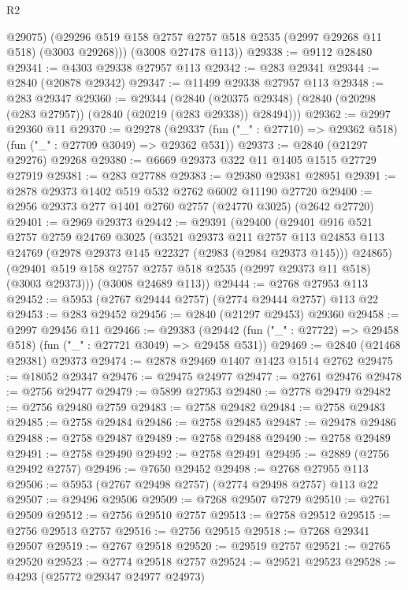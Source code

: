 \begin{lexlean}{R2}
\begin{coremodule}
          @29075)
        (@29296 @519 @158 @2757 @2757 @518 @2535 (@2997 @29268 @11 @518) (@3003 @29268)))
      (@3008 @27478 @113))
@29338 := @9112 @28480
@29341 := @4303 @29338 @27957 @113
@29342 := @283 @29341
@29344 := @2840 (@20878 @29342)
@29347 := @11499 @29338 @27957 @113
@29348 := @283 @29347
@29360 := @29344
    (@2840 (@20375 @29348) (@2840 (@20298 (@283 @27957)) (@2840 (@20219 (@283 @29338)) @28494)))
@29362 := @2997 @29360 @11
@29370 := @29278
    (@29337 (fun ("_" : @27710) => @29362 @518) (fun ("_" : @27709 @3049) => @29362 @531))
@29373 := @2840 (@21297 @29276) @29268
@29380 := @6669 @29373 @322 @11 @1405 @1515 @27729 @27919
@29381 := @283 @27788
@29383 := @29380 @29381 @28951
@29391 := @2878 @29373 @1402 @519 @532 @2762 @6002 @11190 @27720
@29400 := @2956 @29373 @277 @1401 @2760 @2757 (@24770 @3025) (@2642 @27720)
@29401 := @2969 @29373
@29442 := @29391
    (@29400
      (@29401
        @916
        @521
        @2757
        @2759
        @24769
        @3025
        (@3521
          @29373
          @211
          @2757
          @113
          @24853
          @113
          @24769
          (@2978 @29373 @145 @22327 (@2983 (@2984 @29373 @145)))
          @24865)
        (@29401 @519 @158 @2757 @2757 @518 @2535 (@2997 @29373 @11 @518) (@3003 @29373)))
      (@3008 @24689 @113))
@29444 := @2768 @27953 @113
@29452 := @5953 (@2767 @29444 @2757) (@2774 @29444 @2757) @113 @22
@29453 := @283 @29452
@29456 := @2840 (@21297 @29453) @29360
@29458 := @2997 @29456 @11
@29466 := @29383
    (@29442 (fun ("_" : @27722) => @29458 @518) (fun ("_" : @27721 @3049) => @29458 @531))
@29469 := @2840 (@21468 @29381) @29373
@29474 := @2878 @29469 @1407 @1423 @1514 @2762
@29475 := @18052 @29347
@29476 := @29475 @24977
@29477 := @2761 @29476
@29478 := @2756 @29477
@29479 := @5899 @27953
@29480 := @2778 @29479
@29482 := @2756 @29480 @2759
@29483 := @2758 @29482
@29484 := @2758 @29483
@29485 := @2758 @29484
@29486 := @2758 @29485
@29487 := @29478 @29486
@29488 := @2758 @29487
@29489 := @2758 @29488
@29490 := @2758 @29489
@29491 := @2758 @29490
@29492 := @2758 @29491
@29495 := @2889 (@2756 @29492 @2757)
@29496 := @7650 @29452
@29498 := @2768 @27955 @113
@29506 := @5953 (@2767 @29498 @2757) (@2774 @29498 @2757) @113 @22
@29507 := @29496 @29506
@29509 := @7268 @29507 @7279
@29510 := @2761 @29509
@29512 := @2756 @29510 @2757
@29513 := @2758 @29512
@29515 := @2756 @29513 @2757
@29516 := @2756 @29515
@29518 := @7268 @29341 @29507
@29519 := @2767 @29518
@29520 := @29519 @2757
@29521 := @2765 @29520
@29523 := @2774 @29518 @2757
@29524 := @29521 @29523
@29528 := @4293 (@25772 @29347 @24977 @24973)

\end{coremodule}
\end{lexlean}
